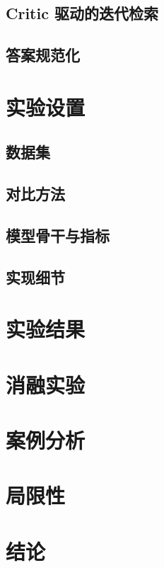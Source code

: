 ﻿\documentclass[UTF8,11pt,twocolumn]{ctexart}
\begin{document}
\subsection{Critic 驱动的迭代检索}
\subsection{答案规范化}

\section{实验设置}
\subsection{数据集}
\subsection{对比方法}
\subsection{模型骨干与指标}
\subsection{实现细节}

\section{实验结果}


\section{消融实验}
\section{案例分析}
\section{局限性}
\section{结论}



\end{document}
